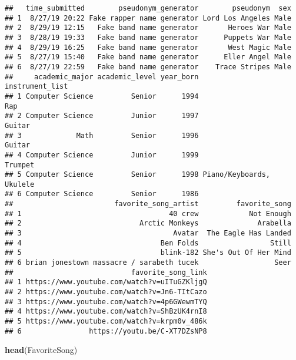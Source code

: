 \documentclass[]{article}
\newenvironment{Shaded}{\begin{snugshade}}{\end{snugshade}}
\newcommand{\KeywordTok}[1]{\textcolor[rgb]{0.13,0.29,0.53}{\textbf{#1}}}
\newcommand{\NormalTok}[1]{#1}
\begin{document}
\begin{verbatim}
##   time_submitted        pseudonym_generator        pseudonym  sex
## 1  8/27/19 20:22 Fake rapper name generator Lord Los Angeles Male
## 2  8/29/19 12:15   Fake band name generator       Heroes War Male
## 3  8/28/19 19:33   Fake band name generator      Puppets War Male
## 4  8/29/19 16:25   Fake band name generator       West Magic Male
## 5  8/27/19 15:40   Fake band name generator      Eller Angel Male
## 6  8/27/19 22:59   Fake band name generator    Trace Stripes Male
##     academic_major academic_level year_born          instrument_list
## 1 Computer Science         Senior      1994                      Rap
## 2 Computer Science         Junior      1997                   Guitar
## 3             Math         Senior      1996                   Guitar
## 4 Computer Science         Junior      1999                  Trumpet
## 5 Computer Science         Senior      1998 Piano/Keyboards, Ukulele
## 6 Computer Science         Senior      1986                         
##                        favorite_song_artist         favorite_song
## 1                                   40 crew            Not Enough
## 2                            Arctic Monkeys              Arabella
## 3                                    Avatar  The Eagle Has Landed
## 4                                 Ben Folds                 Still
## 5                                 blink-182 She's Out Of Her Mind
## 6 brian jonestown massacre / sarabeth tucek                  Seer
##                            favorite_song_link
## 1 https://www.youtube.com/watch?v=uITuGZKljgQ
## 2 https://www.youtube.com/watch?v=Jn6-TItCazo
## 3 https://www.youtube.com/watch?v=4p6GWewmTYQ
## 4 https://www.youtube.com/watch?v=ShBzUK4rnI8
## 5 https://www.youtube.com/watch?v=krpm0v_486k
## 6                https://youtu.be/C-XT7DZsNP8
\end{verbatim}

\begin{Shaded}
\begin{Highlighting}[]
\KeywordTok{head}\NormalTok{(FavoriteSong)}
\end{Highlighting}
\end{Shaded}
\end{document}
